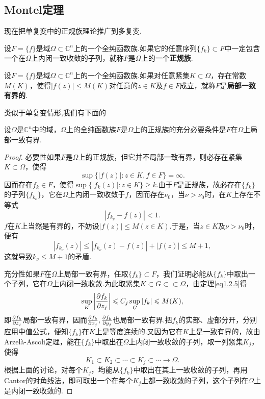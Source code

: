 \subsection{Montel定理}
现在把单复变中的正规族理论推广到多复变.
\begin{definition}
	设$F=\{f\}$是域$\Omega\subset\mathbb{C}^n$上的一个全纯函数族.如果它的任意序列$\{f_k\}\subset F$中一定包含一个在$\Omega$上内闭一致收敛的子列，就称$F$是$\Omega$上的一个\textbf{正规族}.
\end{definition}
\begin{definition}
	设$F=\{f\}$是域$\Omega\subset\mathbb{C}^n$上的一个全纯函数族.如果对任意紧集$K\subset\Omega$，存在常数$M(K)$，使得$|f(z)|\le M(K)$对任意的$z\in K$及$f\in F$成立，就称$F$是\textbf{局部一致有界的}.
\end{definition}
类似于单复变情形,我们有下面的
\begin{theorem}\label{thm1.2.9}
	设$\Omega$是$\mathbb{C}^n$中的域，$\Omega$上的全纯函数族$F$是$\Omega$上的正规族的充分必要条件是$F$在$\Omega$上局部一致有界.
\end{theorem}
\begin{proof}
		必要性\quad 如果$F$是$\Omega$上的正规族，但它并不局部一致有界，则必存在紧集$K\subset\Omega$，使得
		\[\sup\{|f(z)|\colon z\in K,f\in F\}=\infty.\]
		因而存在$f_k\in F$，使得$\sup\{|f_k(z)|\colon z\in K\}\ge k$.由于$F$是正规族，故必存在$\{f_k\}$的子列$\{f_{k_\nu}\}$，它在$\Omega$上内闭一致收敛于$f$，因而存在$\nu_0$，当$\nu>\nu_0$时，在$K$上存在不等式
		\[|f_{k_\nu}-f(z)|<1.\]
		$f$在$K$上当然是有界的，不妨设$|f(z)|\le M(z\in K)$.于是，当$z\in K$及$\nu>\nu_0$时，便有
		\[|f_{k_\nu}(z)|\le|f_{k_\nu}(z)-f(z)|+|f(z)|\le M+1,\]
		这就导致$k_\nu \le M+1$的矛盾.
		
		充分性\quad 如果$F$在$\Omega$上局部一致有界，任取$\{f_k\}\subset F$，我们证明必能从$\{f_k\}$中取出一个子列，它在$\Omega$上内闭一致收敛.为此取紧集$K\subset G\subset\subset\Omega$，由定理\ref{eq1.2.5}得
		\[\sup_K \bigg|\frac{\partial f_k}{\partial z_j}\bigg|\leqslant C_j \sup_G |f_k|\leqslant M(K),\]
		即$\frac{\partial f_k}{\partial z_j}$局部一致有界，因而$\frac{\partial f_k}{\partial x_j},\frac{\partial f_k}{\partial y_j}$也局部一致有界.把$f_k$的实部、虚部分开，分别应用中值公式，便知$\{f_k\}$在$K$上是等度连续的.又因为它在$K$上是一致有界的，故由Arzel\`a-Ascoli定理，能在$\{f_k\}$中取出在$\Omega$上内闭一致收敛的子列，取一列紧集$K_j$，使得
		\[K_1\subset K_2\subset\cdots\subset K_j\subset\cdots\to\Omega.\]
		根据上面的讨论，对每个$K_j$，均能从$\{f_k\}$中取出在其上一致收敛的子列，再用Cantor的对角线法，即可取出一个在每个$K_j$上都一致收敛的子列，这个子列在$\Omega$上是内闭一致收敛的.
\end{proof}

